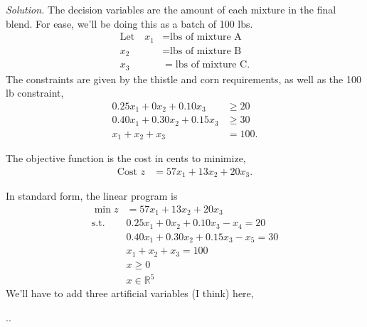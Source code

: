 \documentclass{homework}
\newcommand{\st}{\mathrm{s.t.}}
\newcommand{\solution}{	\vspace{1em} \textit{Solution.} \quad }
\begin{document}
\begin{enumerate}
		\solution The decision variables are the amount of each mixture in the final blend. For ease, we'll be doing this as a batch of 100 lbs. \begin{align*}
			\text{Let} \quad x_1 & = \text{lbs of mixture A} \\
				x_2 & = \text{lbs of mixture B} \\
				x_3 & = \text{lbs of mixture C}.
		\end{align*}
		The constraints are given by the thistle and corn requirements, as well as the 100 lb constraint, \begin{align*}
			0.25 x_1 + 0 x_2 + 0.10 x_3 & \ge 20 \\
			0.40 x_1 + 0.30 x_2 + 0.15 x_3 & \ge 30 \\
			x_1 + x_2 + x_3 & = 100.
		\end{align*}
		
		The objective function is the cost in cents to minimize, \begin{align*}
			\text{Cost } z & = 57 x_1 + 13 x_2 + 20 x_3.
		\end{align*}
	
		In standard form, the linear program is \begin{align*}
			\min z  & = 57 x_1 + 13 x_2 + 20 x_3 \\
			\st \quad & 0.25 x_1 + 0 x_2 + 0.10 x_3 - x_4 = 20 \\
			& 0.40 x_1 + 0.30 x_2 + 0.15 x_3 - x_5 = 30 \\
			& x_1 + x_2 + x_3 = 100 \\
			& x \ge 0 \\
			& x \in \mathbb{R}^5
		\end{align*}
		We'll have to add three artificial variables (I think) here, 
		\begin{center}
			\sysdelim..
		\end{center} 
		

\end{enumerate}
\end{document}
